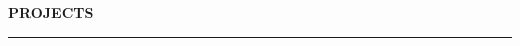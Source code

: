 \documentclass[notitlepage,10pt,a4paper]{article}
\newenvironment{resumesection}[1]{
    \header{#1}
}{}
\newcommand{\header}[1]{
    \vspace{2pt}
    \textcolor{accent1}{\Large \textbf{#1}}
    \vspace{6pt}\hrule\vspace{4pt}
}
\newcommand{\TECH}{
    \textcolor{accent3}{\small\textbf{SKILLS}}\small\,
}
\newcommand{\thingsep}{
    \vspace{4pt}
}
\begin{document}
\begin{resumesection}{PROJECTS}



\end{resumesection}
\end{document}
